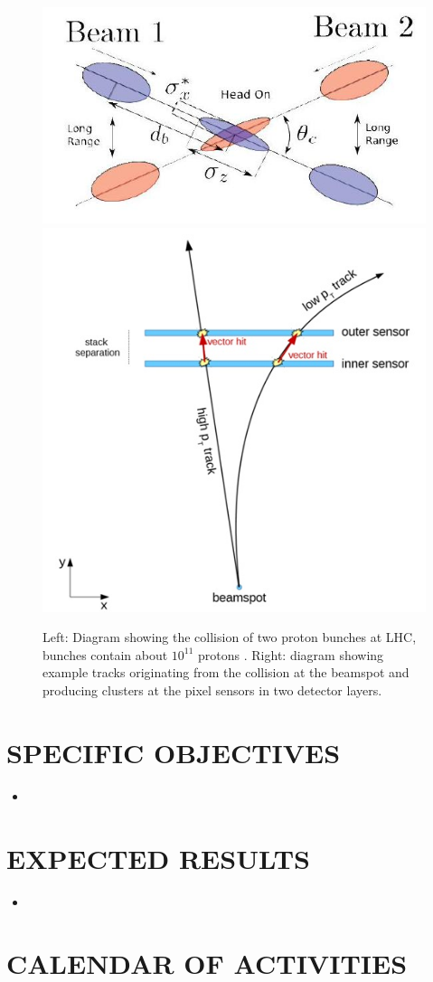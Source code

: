 \documentclass[final,12pt]{article}
\begin{document}
\begin{figure}[H]
  \centering
  \includegraphics[width=0.5\columnwidth]{./bunchcrossing.jpg}
  \includegraphics[width=0.4\columnwidth]{./vectorhit1.jpg}
  \caption{
    Left: Diagram showing the collision of two proton bunches at LHC, bunches contain about $10^{11}$ protons  \cite{deMaria:2008zzb}.
    Right: diagram showing example tracks originating from the collision at the beamspot and producing clusters at the pixel sensors in two detector layers.
  }
  \label{fig:trackcluster}
\end{figure}


\section{SPECIFIC OBJECTIVES}

\begin{itemize}
\item 

\end{itemize}



\section{EXPECTED RESULTS}

\begin{itemize}
\item 

\end{itemize}

\section{CALENDAR OF ACTIVITIES}
\end{document}
